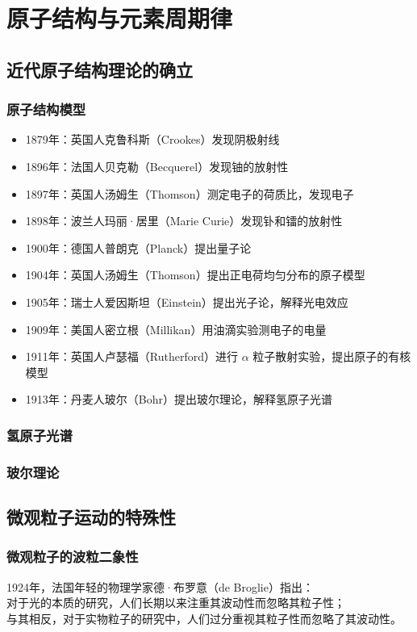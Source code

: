\chapter{原子结构与元素周期律}

\section{近代原子结构理论的确立}

\subsection{原子结构模型}
\begin{itemize}
    \item 1879年：英国人克鲁科斯（Crookes）发现阴极射线
    \item 1896年：法国人贝克勒（Becquerel）发现铀的放射性
    \item 1897年：英国人汤姆生（Thomson）测定电子的荷质比，发现电子
    \item 1898年：波兰人玛丽·居里（Marie Curie）发现钋和镭的放射性
    \item 1900年：德国人普朗克（Planck）提出量子论
    \item 1904年：英国人汤姆生（Thomson）提出正电荷均匀分布的原子模型
    \item 1905年：瑞士人爱因斯坦（Einstein）提出光子论，解释光电效应
    \item 1909年：美国人密立根（Millikan）用油滴实验测电子的电量
    \item 1911年：英国人卢瑟福（Rutherford）进行 $\alpha$ 粒子散射实验，提出原子的有核模型
    \item 1913年：丹麦人玻尔（Bohr）提出玻尔理论，解释氢原子光谱
\end{itemize}

\subsection{氢原子光谱}

\subsection{玻尔理论}

\section{微观粒子运动的特殊性}

\subsection{微观粒子的波粒二象性}
1924年，法国年轻的物理学家德·布罗意（de Broglie）指出：\\
对于光的本质的研究，人们长期以来注重其波动性而忽略其粒子性；\\
与其相反，对于实物粒子的研究中，人们过分重视其粒子性而忽略了其波动性。


